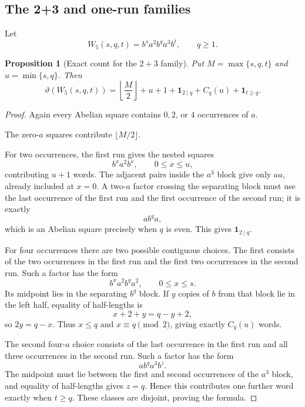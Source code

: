 \documentclass[11pt]{article}
\newtheorem{proposition}[theorem]{Proposition}
\theoremstyle{definition}
\newcommand{\thetaas}{\vartheta}
\newcommand{\ind}{\mathbf 1}
\begin{document}
\subsection{The 2+3 and one-run families}

Let
\begin{equation}\label{eq:W5}
 W_5(s,q,t)=b^s a^2 b^q a^3 b^t,\qquad q\ge1.
\end{equation}

\begin{proposition}[Exact count for the $2+3$ family]\label{prop:x5-23}
Put $M=\max\{s,q,t\}$ and $u=\min\{s,q\}$. Then
\[
 \thetaas(W_5(s,q,t))
 =\left\lfloor\frac M2\right\rfloor
  +u+1
  +\ind_{2\mid q}
  +C_q(u)
  +\ind_{t\ge q}.
\]
\end{proposition}

\begin{proof}
Again every Abelian square contains $0,2$, or $4$ occurrences of $a$.

The zero-$a$ squares contribute $\lfloor M/2\rfloor$.

For two occurrences, the first run gives the nested squares
\[
 b^x a^2b^x,
 \qquad0\le x\le u,
\]
contributing $u+1$ words. The adjacent pairs inside the $a^3$ block give only $aa$, already included at $x=0$. A two-$a$ factor crossing the separating block must use the last occurrence of the first run and the first occurrence of the second run; it is exactly
\[
 ab^q a,
\]
which is an Abelian square precisely when $q$ is even. This gives $\ind_{2\mid q}$.

For four occurrences there are two possible contiguous choices. The first consists of the two occurrences in the first run and the first two occurrences in the second run. Such a factor has the form
\[
 b^x a^2b^q a^2,
 \qquad0\le x\le s.
\]
Its midpoint lies in the separating $b^q$ block. If $y$ copies of $b$ from that block lie in the left half, equality of half-lengths is
\[
 x+2+y=q-y+2,
\]
so $2y=q-x$. Thus $x\le q$ and $x\equiv q\pmod2$, giving exactly $C_q(u)$ words.

The second four-$a$ choice consists of the last occurrence in the first run and all three occurrences in the second run. Such a factor has the form
\[
 ab^q a^3b^z.
\]
The midpoint must lie between the first and second occurrences of the $a^3$ block, and equality of half-lengths gives $z=q$. Hence this contributes one further word exactly when $t\ge q$. These classes are disjoint, proving the formula.
\end{proof}
\end{document}
